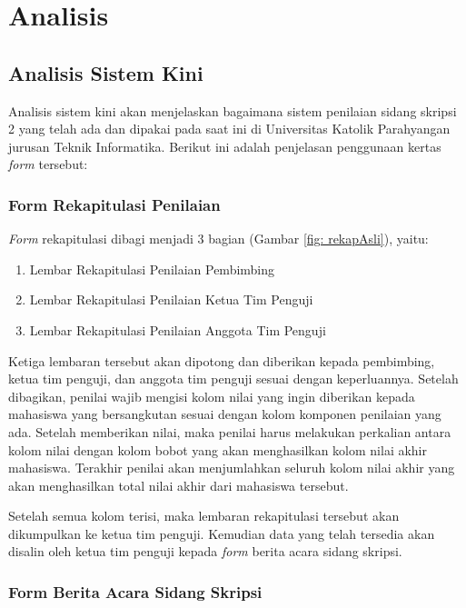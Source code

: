\chapter{Analisis}
\label{chap: analisis}

\section{Analisis Sistem Kini}
\label{sec: analisiSKini}

Analisis sistem kini akan menjelaskan bagaimana sistem penilaian sidang skripsi 2 yang telah ada dan dipakai pada saat ini di Universitas Katolik Parahyangan jurusan Teknik Informatika. Berikut ini adalah penjelasan penggunaan kertas \textit{form} tersebut:

	\subsection{Form Rekapitulasi Penilaian}
	\label{sub: rekapPenil}
	
	\textit{Form} rekapitulasi dibagi menjadi 3 bagian (Gambar \ref{fig: rekapAsli}), yaitu:
		\begin{enumerate}
			\item Lembar Rekapitulasi Penilaian Pembimbing
			\item Lembar Rekapitulasi Penilaian Ketua Tim Penguji
			\item Lembar Rekapitulasi Penilaian Anggota Tim Penguji
		\end{enumerate}
	
	Ketiga lembaran tersebut akan dipotong dan diberikan kepada pembimbing, ketua tim penguji, dan anggota tim penguji sesuai dengan keperluannya. Setelah dibagikan, penilai wajib mengisi kolom nilai yang ingin diberikan kepada mahasiswa yang bersangkutan sesuai dengan kolom komponen penilaian yang ada. Setelah memberikan nilai, maka penilai harus melakukan perkalian antara kolom nilai dengan kolom bobot yang akan menghasilkan kolom nilai akhir mahasiswa. Terakhir penilai akan menjumlahkan seluruh kolom nilai akhir yang akan menghasilkan total nilai akhir dari mahasiswa tersebut.
	
	Setelah semua kolom terisi, maka lembaran rekapitulasi tersebut akan dikumpulkan ke ketua tim penguji. Kemudian data yang telah tersedia akan disalin oleh ketua tim penguji kepada \textit{form} berita acara sidang skripsi.
	
	\subsection{Form Berita Acara Sidang Skripsi}
	\label{sub: formSkripsi}
	
